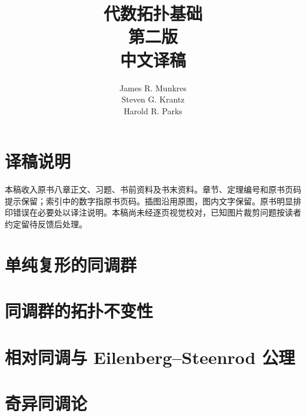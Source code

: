 \documentclass[UTF8,11pt,openany]{ctexbook}
\title{代数拓扑基础\\第二版\\中文译稿}
\author{James R. Munkres\\Steven G. Krantz\\Harold R. Parks}
\date{}
\begin{document}
\frontmatter
\maketitle
\chapter*{译稿说明}
本稿收入原书八章正文、习题、书前资料及书末资料。章节、定理编号和原书页码提示保留；索引中的数字指原书页码。插图沿用原图，图内文字保留。原书明显排印错误在必要处以译注说明。本稿尚未经逐页视觉校对，已知图片裁剪问题按读者约定留待反馈后处理。

\tableofcontents
{}
\mainmatter
\chapter{单纯复形的同调群}













\chapter{同调群的拓扑不变性}










\chapter{相对同调与 Eilenberg--Steenrod 公理}







\chapter{奇异同调论}














\end{document}
